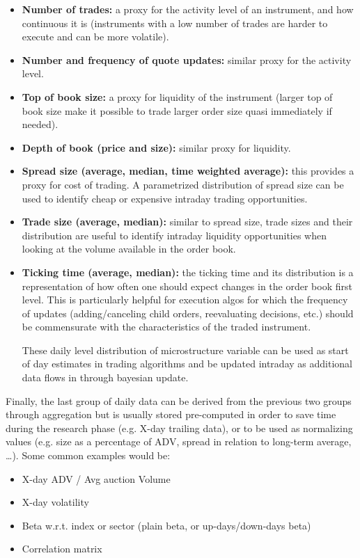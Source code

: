 \begin{itemize}
\item \textbf{Number of trades:} a proxy for the activity level of an instrument, and how continuous it is (instruments with a low number of trades are harder to execute and can be more volatile). 
\item \textbf{Number and frequency of quote updates:} similar proxy for the activity level.
\item \textbf{Top of book size:} a proxy for liquidity of the instrument (larger top of book size make it possible to trade larger order size quasi immediately if needed).
\item \textbf{Depth of book (price and size):} similar proxy for liquidity.
\item \textbf{Spread size (average, median, time weighted average):} this provides a proxy for cost of trading. A parametrized distribution of spread size can be used to identify cheap or expensive intraday trading opportunities.
\item \textbf{Trade size (average, median):} similar to spread size, trade sizes and their distribution are useful to identify intraday liquidity opportunities when looking at the volume available in the order book.
\item \textbf{Ticking time (average, median):} the ticking time and its distribution is a representation of how often one should expect changes in the order book first level. This is particularly helpful for execution algos for which the frequency of updates (adding/canceling child orders, reevaluating decisions, etc.) should be commensurate with the characteristics of the traded instrument.

These daily level distribution of microstructure variable can be used as start of day estimates in trading algorithms and be updated intraday as additional data flows in through bayesian update.
\end{itemize}

Finally, the last group of daily data can be derived from the previous two groups through aggregation but is usually stored pre-computed in order to save time during the research phase (e.g. X-day trailing data), or to be used as normalizing values (e.g. size as a percentage of ADV, spread in relation to long-term average, \dots). Some common examples would be:

\begin{itemize}

\item X-day ADV / Avg auction Volume
\item X-day volatility
\item Beta w.r.t. index or sector (plain beta, or up-days/down-days beta)
\item Correlation matrix
\end{itemize}

